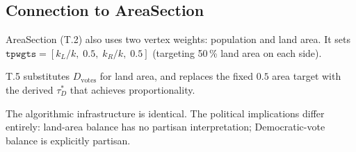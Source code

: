 \subsection{Connection to AreaSection}

AreaSection (T.2) also uses two vertex weights: population and land area.
It sets
$\mathtt{tpwgts} = [k_L/k,\; 0.5,\; k_R/k,\; 0.5]$ (targeting 50\,\%
land area on each side).

T.5 substitutes $D_{\text{votes}}$ for land area, and replaces the fixed
$0.5$ area target with the derived $\tau_D^*$ that achieves proportionality.

The algorithmic infrastructure is identical.
The political implications differ entirely:
land-area balance has no partisan interpretation; Democratic-vote balance
is explicitly partisan.

